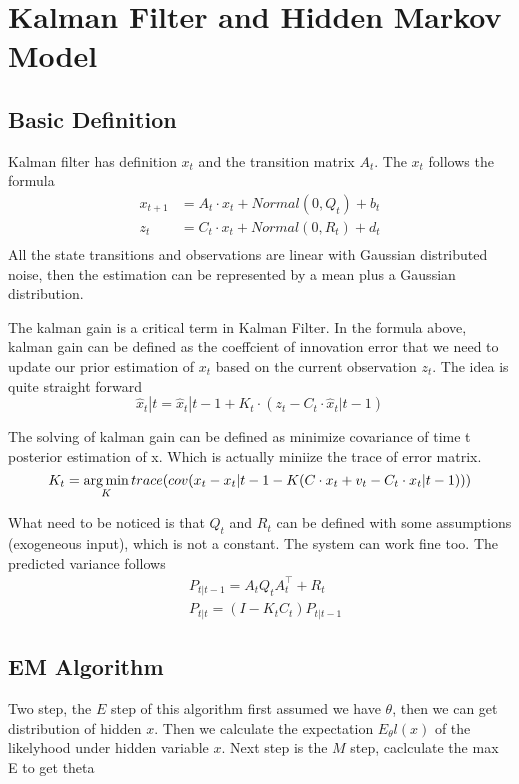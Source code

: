 \section{Kalman Filter and Hidden Markov Model}

\subsection{Basic Definition}
Kalman filter has definition $x_t$ and the transition matrix $A_t$. The $x_t$ follows the formula
\begin{equation}
  \begin{aligned}
    x_{t+1} &= A_t \cdot x_t + Normal(0, Q_t) + b_t\\
    z_{t} &= C_t \cdot x_t + Normal(0, R_t) + d_t\\
  \end{aligned}
\end{equation}
All the state transitions and observations are linear with Gaussian distributed noise, then the
estimation can be represented by a mean plus a Gaussian distribution.

The kalman gain is a critical term in Kalman Filter. In the formula above, kalman gain can be defined as the {\color{blue}coeffcient of
innovation error that we need to update our prior estimation of $x_t$ }based on the current observation $z_t$. The idea is quite
straight forward  $$\hat{x}_t|t = \hat{x}_t|t-1 + K_t \cdot (z_t - C_t \cdot \hat{x}_t|t-1)$$

The solving of kalman gain can be defined as minimize covariance of time t posterior estimation of x. Which is actually miniize the trace of error matrix.
\begin{equation}
K_t = \operatorname*{arg\,min}_K trace( cov(x_t - x_t|t-1 - K(C \cdot x_t + v_t - C_t \cdot x_t|t-1)))
\end{equation}

What need to be noticed is that $Q_t$ and $R_t$ can be defined with some assumptions (exogeneous input), which is not a constant. The system can work fine too. The predicted variance follows
\begin{equation}
  \begin{aligned}
    &P_{t|t-1} = A_t Q_t A_t^\top + R_t \\
    &P_{t|t} = (I - K_t C_t) P_{t|t-1}
  \end{aligned}
\end{equation}

\subsection{EM Algorithm}
Two step, the $E$ step of this algorithm first assumed we have $\theta$, then we can get distribution of hidden $x$. Then we calculate the expectation $E_{\theta}l(x)$ of the likelyhood under hidden variable $x$.
Next step is the $M$ step, caclculate the max E to get theta

